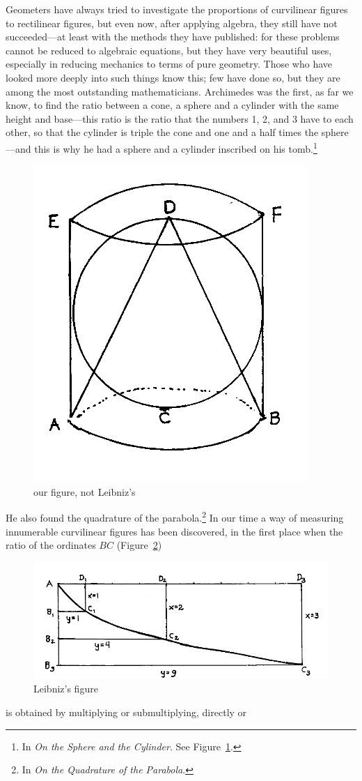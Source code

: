 \documentclass[polutonikogreek,english,twoside,openright]{article}
\begin{document}
\vspace{2ex}
  
Geometers have always tried to investigate the proportions of
curvilinear figures to rectilinear figures, but even now, after
applying algebra, they still have not succeeded---at least with the
methods they have published: for these problems cannot be reduced to
algebraic equations, but they have very beautiful uses, especially in
reducing mechanics to terms of pure geometry. Those who have looked
more deeply into such things know this; few have done so, but they are
among the most outstanding mathematicians.  Archimedes was the first,
as far we know, to find the ratio between a cone, a sphere and a
cylinder with the same height and base---this ratio is the ratio
that the numbers 1, 2, and 3 have to each other, so that the cylinder
is triple the cone and one and a half times the sphere---and this is
why he had a sphere and a cylinder inscribed on his tomb.\footnote{In
  {\em On the Sphere and the Cylinder}.  See Figure~\ref{archsc}.}
\begin{figure}[htp]
  \begin{center}
    \includegraphics[width=.4\textwidth]{fig/Figure56}
    \caption{our figure, not Leibniz's}
    \label{archsc}
  \end{center}
\end{figure} He also found the quadrature of the parabola.\footnote{In
  {\em On the Quadrature of the Parabola}.}  In our time a way of
measuring innumerable curvilinear figures has been discovered, in the
first place when the ratio of the ordinates $BC$
(Figure~\ref{quadpar})
\begin{figure}[htp]
  \begin{center}
    \includegraphics[width=\textwidth]{fig/Figure57}
    \caption{Leibniz's figure}
    \label{quadpar}
  \end{center}
\end{figure} is obtained by multiplying or submultiplying, directly or
\end{document}
